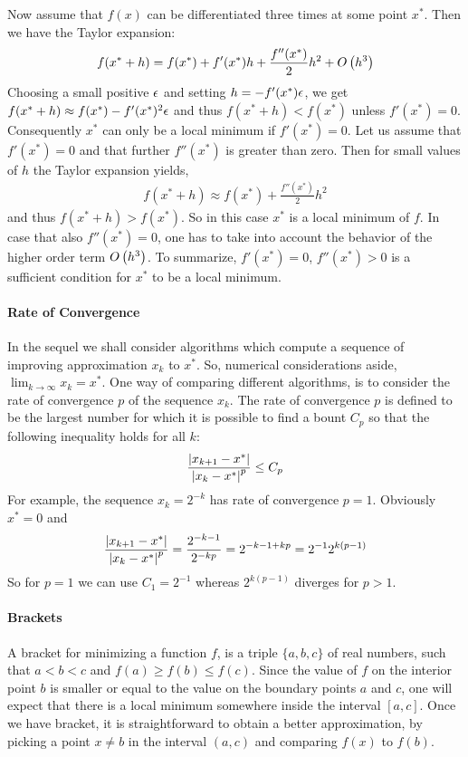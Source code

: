 Now assume that $f(x)$ can be differentiated three times at some point $x^*$. Then we have the Taylor expansion:
\begin{align*}
	f(x^*+h)=f(x^*)+f'(x^*)h+\frac{f''(x^*)}{2}h^2+O\left(h^3\right)
\end{align*}
Choosing a small positive $\epsilon$ and setting $h=-f'(x^*)\epsilon$, we get $f(x^*+h)\approx f(x^*)-f'(x^*)^2\epsilon$ and thus $f(x^*+h)<f(x^*)$ unless $f'(x^*)=0$. Consequently $x^*$ can only be a local minimum if $f'(x^*)=0$. Let us assume that $f'(x^*)=0$ and that further $f''(x^*)$ is greater than zero. Then for small values of $h$ the Taylor expansion yields,
\begin{align*}
	f(x^*+h)\approx f(x^*)+\frac{f''(x^*)}{2}h^2
\end{align*}
and thus $f(x^*+h)>f(x^*)$. So in this case $x^*$ is a local minimum of $f$. In case that also $f''(x^*)=0$, one has to take into account the behavior of the higher order term $O\left(h^3\right)$. To summarize, $f'(x^*)=0$, $f''(x^*)>0$ is a sufficient condition for $x^*$ to be a local minimum.

\paragraph{Rate of Convergence}

In the sequel we shall consider algorithms which compute a sequence of improving approximation $x_k$ to $x^*$. So, numerical considerations aside, $\lim_{k\to\infty}x_k=x^*$. One way of comparing different algorithms, is to consider the rate of convergence $p$ of the sequence $x_k$. The rate of convergence $p$ is defined to be the largest number for which it is possible to find a bount $C_p$ so that the following inequality holds for all $k$:
\begin{align*}
	\frac{\left\vert x_{k+1}-x^*\right\vert}{\left\vert x_k-x^*\right\vert^p}\leq C_p
\end{align*}
For example, the sequence $x_k=2^{-k}$ has rate of convergence $p=1$. Obviously $x^*=0$ and
\begin{align*}
	\frac{\left\vert x_{k+1}-x^*\right\vert}{\left\vert x_k-x^*\right\vert^p}=\frac{2^{-k-1}}{2^{-kp}}=2^{-k-1+kp}=2^{-1}2^{k(p-1)}
\end{align*}
So for $p=1$ we can use $C_1=2^{-1}$ whereas $2^{k(p-1)}$ diverges for $p>1$.

\paragraph{Brackets}

A bracket for minimizing a function $f$, is a triple $\{a,b,c\}$ of real numbers, such that $a<b<c$ and $f(a)\geq f(b)\leq f(c)$. Since the value of $f$ on the interior point $b$ is smaller or equal to the value on the boundary points $a$ and $c$, one will expect that there is a local minimum somewhere inside the interval $[a,c]$. Once we have bracket, it is straightforward to obtain a better approximation, by picking a point $x\neq b$ in the interval $(a,c)$ and comparing $f(x)$ to $f(b)$.

